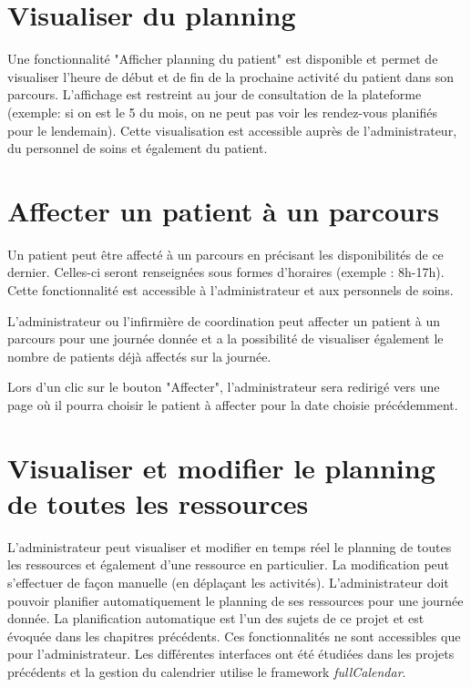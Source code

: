 \documentclass[noposter]{polytech/polytech}
\begin{document}
\section{Visualiser du planning}

Une fonctionnalité "Afficher planning du patient" est disponible et permet de visualiser l'heure de début et de fin de la prochaine activité du patient dans son parcours. L'affichage est restreint au jour de consultation de la plateforme (exemple: si on est le 5 du mois, on ne peut pas voir les rendez-vous planifiés pour le lendemain). Cette visualisation est accessible auprès de l'administrateur, du personnel de soins et également du patient.


\section{Affecter un patient à un parcours}

Un patient peut être affecté à un parcours en précisant les disponibilités de ce dernier. Celles-ci seront renseignées sous formes d'horaires (exemple : 8h-17h). Cette fonctionnalité est accessible à l'administrateur et aux personnels de soins. 

L'administrateur ou l'infirmière de coordination peut affecter un patient à un parcours pour une journée donnée et a la possibilité de visualiser également le nombre de patients déjà affectés sur la journée.

Lors d'un clic sur le bouton "Affecter", l'administrateur sera redirigé vers une page où il pourra choisir le patient à affecter pour la date choisie précédemment.


\section{Visualiser et modifier le planning de toutes les ressources}

L'administrateur peut visualiser et modifier en temps réel le planning de toutes les ressources et également d'une ressource en particulier. La modification peut s'effectuer de façon manuelle (en déplaçant les activités). L'administrateur doit pouvoir planifier automatiquement le planning de ses ressources pour une journée donnée. La planification automatique est l'un des sujets de ce projet et est évoquée dans les chapitres précédents. Ces fonctionnalités ne sont accessibles que pour l'administrateur. Les différentes interfaces ont été étudiées dans les projets précédents et la gestion du calendrier utilise le framework \textit{fullCalendar}.
\end{document}
